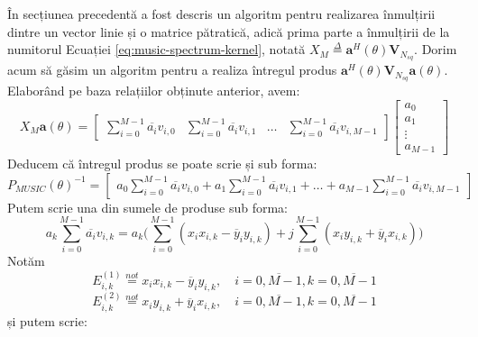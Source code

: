 În secțiunea precedentă a fost descris un algoritm pentru realizarea înmulțirii
dintre un vector linie și o matrice pătratică, adică prima parte a înmulțirii de
la numitorul Ecuației \eqref{eq:music-spectrum-kernel}, notată 
$X_M \overset{\Delta}{=} \bm{a}^H(\theta)\bm{V}_{N_{sq}}$. Dorim acum să găsim un
algoritm pentru a realiza întregul produs
$\bm{a}^H(\theta)\bm{V}_{N_{sq}}\bm{a}(\theta)$.  Elaborând pe baza relațiilor
obținute anterior, avem:
\begin{equation}
  X_M\bm{a}(\theta)
  =
  \begin{bmatrix}
    \displaystyle{\sum_{i=0}^{M-1} \overline{a_i}v_{i,0}} & 
    \displaystyle{\sum_{i=0}^{M-1} \overline{a_i}v_{i,1}} & 
    \hdots &
    \displaystyle{\sum_{i=0}^{M-1} \overline{a_i}v_{i,M-1}}
  \end{bmatrix}
  \begin{bmatrix}
    a_0   \\   
    a_1   \\   
    \vdots   \\   
    a_{M-1}
  \end{bmatrix}
\end{equation}
Deducem că întregul produs se poate scrie și sub forma:
\begin{equation}
  P_{MUSIC}(\theta)^{-1}
  =
  \begin{bmatrix}
    \displaystyle{a_0\sum_{i=0}^{M-1} \overline{a_i}v_{i,0}} +
    \displaystyle{a_1\sum_{i=0}^{M-1} \overline{a_i}v_{i,1}} +
    \hdots +
    \displaystyle{a_{M-1}\sum_{i=0}^{M-1} \overline{a_i}v_{i,M-1}}
  \end{bmatrix}
\end{equation}
Putem scrie una din sumele de produse sub forma: \\
\begin{equation}
  a_k\sum_{i=0}^{M-1} \overline{a_i}v_{i,k} = 
  a_k\Bigg(
       \sum_{i=0}^{M-1} (x_ix_{i,k} - \overline{y}_iy_{i,k}) + 
      j\sum_{i=0}^{M-1}(x_iy_{i,k} + \overline{y}_ix_{i,k})
      \Bigg)
\end{equation}
Notăm
\begin{equation}
  E_{i,k}^{(1)} \overset{not}{=} x_ix_{i,k} - \overline{y}_iy_{i,k}, \quad 
  i = \overline{0, M-1}, k = \overline{0, M-1}
\end{equation}
\begin{equation}
  E_{i,k}^{(2)} \overset{not}{=} x_iy_{i,k} + \overline{y}_ix_{i,k}, \quad
  i = \overline{0, M-1}, k = \overline{0, M-1}
\end{equation}
și putem scrie:

